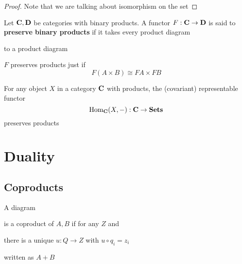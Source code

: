 \documentclass[11pt]{article}
\begin{document}
\begin{proof}
Note that we are talking about isomorphism on the set
\end{proof}

\begin{definition}[]
Let \(\operatorname{\textbf{C}},\operatorname{\textbf{D}}\) be categories with binary products. A functor
\(F:\operatorname{\textbf{C}}\to\operatorname{\textbf{D}}\) is said to \textbf{preserve binary products} if it takes every
product diagram
\begin{center}\end{center}
to a product diagram
\begin{center}\end{center}
\end{definition}
\(F\) preserves products just if
\begin{equation*}
F(A\times B)\cong FA\times FB
\end{equation*}
\begin{corollary}[]
For any object \(X\) in a category \(\operatorname{\textbf{C}}\) with products, the (covariant)
representable functor
\begin{equation*}
\operatorname{Hom}_{\operatorname{\textbf{C}}}(X,-):\operatorname{\textbf{C}}\to\operatorname{\textbf{Sets}}
\end{equation*}
preserves products
\end{corollary}

\section{Duality}
\label{sec:org7b36338}

\subsection{Coproducts}
\label{sec:orgedb378e}
\begin{definition}[]
A diagram
is a coproduct of \(A,B\) if for any \(Z\) and
there is a unique \(u:Q\to Z\) with \(u\circ q_i=z_i\)
\begin{center}\end{center}
written as \(A+B\)
\end{definition}
\end{document}

